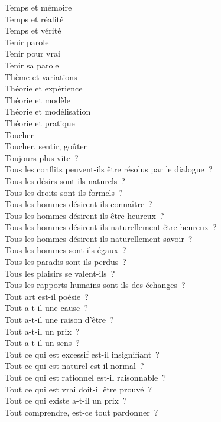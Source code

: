 \documentclass[a4paper,12pt]{article}
\begin{document}
Temps et mémoire \\
Temps et réalité \\
Temps et vérité \\
Tenir parole \\
Tenir pour vrai \\
Tenir sa parole \\
Thème et variations \\
Théorie et expérience \\
Théorie et modèle \\
Théorie et modélisation \\
Théorie et pratique \\
Toucher \\
Toucher, sentir, goûter \\
Toujours plus vite ? \\
Tous les conflits peuvent-ils être résolus par le dialogue ? \\
Tous les désirs sont-ils naturels ? \\
Tous les droits sont-ils formels ? \\
Tous les hommes désirent-ils connaître ? \\
Tous les hommes désirent-ils être heureux ? \\
Tous les hommes désirent-ils naturellement être heureux ? \\
Tous les hommes désirent-ils naturellement savoir ? \\
Tous les hommes sont-ils égaux ? \\
Tous les paradis sont-ils perdus ? \\
Tous les plaisirs se valent-ils ? \\
Tous les rapports humains sont-ils des échanges ? \\
Tout art est-il poésie ? \\
Tout a-t-il une cause ? \\
Tout a-t-il une raison d'être ? \\
Tout a-t-il un prix ? \\
Tout a-t-il un sens ? \\
Tout ce qui est excessif est-il insignifiant ? \\
Tout ce qui est naturel est-il normal ? \\
Tout ce qui est rationnel est-il raisonnable ? \\
Tout ce qui est vrai doit-il être prouvé ? \\
Tout ce qui existe a-t-il un prix ? \\
Tout comprendre, est-ce tout pardonner ? \\
\end{document}
